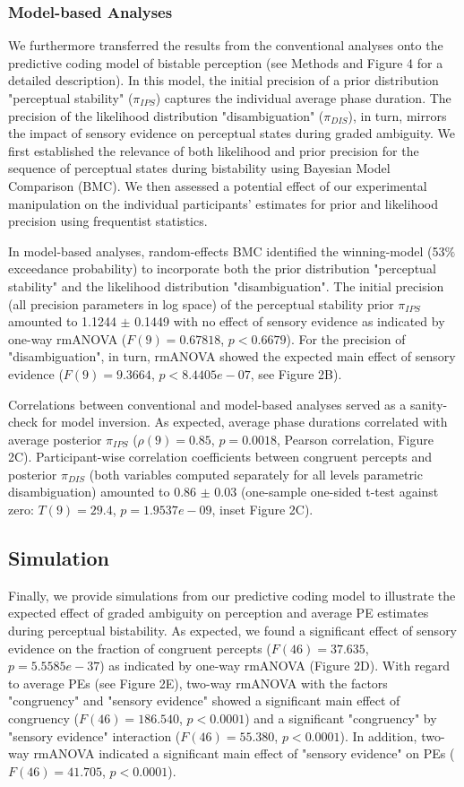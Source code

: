 \documentclass[12pt]{article}
\begin{document}
\subsubsection{Model-based Analyses}
We furthermore transferred the results from the conventional analyses onto the predictive coding model of bistable perception (see Methods and Figure 4 for a detailed description). In this model, the initial precision of a prior distribution "perceptual stability" ($\pi_{IPS}$) captures the individual average phase duration. The precision of the likelihood distribution "disambiguation" ($\pi_{DIS}$), in turn, mirrors the impact of sensory evidence on perceptual states during graded ambiguity. We first established the relevance of both likelihood and prior precision for the sequence of perceptual states during bistability using Bayesian Model Comparison (BMC). We then assessed a potential effect of our experimental manipulation on the individual participants’ estimates for prior and likelihood precision using frequentist statistics. 

In model-based analyses, random-effects BMC identified the winning-model (53$\%$ exceedance probability) to incorporate both the prior distribution "perceptual stability" and the likelihood distribution "disambiguation". The initial precision (all precision parameters in log space) of the perceptual stability prior $\pi_{IPS}$ amounted to 1.1244 $\pm$ 0.1449 with no effect of sensory evidence as indicated by one-way rmANOVA ($F(9) = 0.67818$, $p < 0.6679$). For the precision of "disambiguation", in turn, rmANOVA showed the expected main effect of sensory evidence ($F(9) = 9.3664$, $p < 8.4405e-07$, see Figure 2B).

Correlations between conventional and model-based analyses served as a sanity-check for model inversion. As expected, average phase durations correlated with average posterior $\pi_{IPS}$ ($\rho(9) = 0.85$, $p = 0.0018$, Pearson correlation, Figure 2C). Participant-wise correlation coefficients between congruent percepts and posterior $\pi_{DIS}$ (both variables computed separately for all levels parametric disambiguation) amounted to 0.86 $\pm$ 0.03 (one-sample one-sided t-test against zero: $T(9) = 29.4$, $p = 1.9537e-09$, inset Figure 2C).

\subsection{Simulation}
Finally, we provide simulations from our predictive coding model to illustrate the expected effect of graded ambiguity on perception and average PE estimates during perceptual bistability. As expected, we found a significant effect of sensory evidence on the fraction of congruent percepts ($F(46) = 37.635$, $p = 5.5585e-37$) as indicated by one-way rmANOVA (Figure 2D). With regard to average PEs (see Figure 2E), two-way rmANOVA with the factors "congruency" and "sensory evidence" showed a significant main effect of congruency ($F(46) = 186.540$, $p < 0.0001$) and a significant "congruency" by "sensory evidence" interaction ($F(46) = 55.380$, $p < 0.0001$). In addition, two-way rmANOVA indicated a significant main effect of "sensory evidence" on PEs ($F(46) = 41.705$, $p < 0.0001$).
\end{document}
